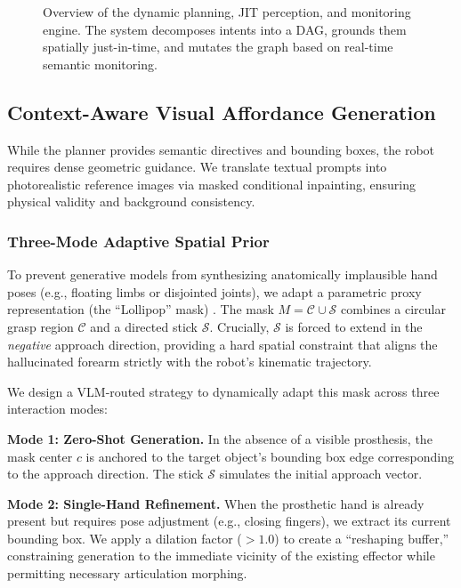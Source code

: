 \documentclass[letterpaper, 10 pt, conference]{ieeeconf}  %
\begin{document}
\begin{figure}[t]
    \centering
    \caption{Overview of the dynamic planning, JIT perception, and monitoring engine. The system decomposes intents into a DAG, grounds them spatially just-in-time, and mutates the graph based on real-time semantic monitoring.}
    \label{fig:planner_monitor}
\end{figure}

\subsection{Context-Aware Visual Affordance Generation}
\label{subsec:visual_generation}

While the planner provides semantic directives and bounding boxes, the robot requires dense geometric guidance. We translate textual prompts into photorealistic reference images via masked conditional inpainting, ensuring physical validity and background consistency.

\subsubsection{Three-Mode Adaptive Spatial Prior}
To prevent generative models from synthesizing anatomically implausible hand poses (e.g., floating limbs or disjointed joints), we adapt a parametric proxy representation (the ``Lollipop'' mask) \cite{ye2023affordance, wang2023robogen}. The mask $M = \mathcal{C} \cup \mathcal{S}$ combines a circular grasp region $\mathcal{C}$ and a directed stick $\mathcal{S}$. Crucially, $\mathcal{S}$ is forced to extend in the \textit{negative} approach direction, providing a hard spatial constraint that aligns the hallucinated forearm strictly with the robot's kinematic trajectory.

We design a VLM-routed strategy to dynamically adapt this mask across three interaction modes:

\textbf{Mode 1: Zero-Shot Generation.} 
In the absence of a visible prosthesis, the mask center $c$ is anchored to the target object's bounding box edge corresponding to the approach direction. The stick $\mathcal{S}$ simulates the initial approach vector.

\textbf{Mode 2: Single-Hand Refinement.} 
When the prosthetic hand is already present but requires pose adjustment (e.g., closing fingers), we extract its current bounding box. We apply a dilation factor ($>1.0$) to create a ``reshaping buffer,'' constraining generation to the immediate vicinity of the existing effector while permitting necessary articulation morphing.
\end{document}
